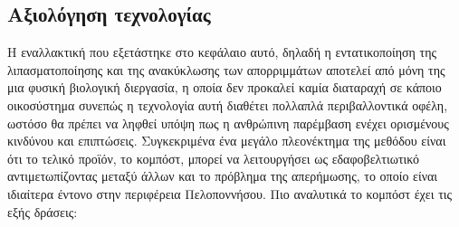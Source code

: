 \documentclass[12pt]{article}
\begin{document}
 	\subsection{Αξιολόγηση τεχνολογίας}
 	
 	Η εναλλακτική που εξετάστηκε στο κεφάλαιο αυτό, δηλαδή η εντατικοποίηση της λιπασματοποίησης και της ανακύκλωσης των απορριμμάτων αποτελεί από μόνη της μια φυσική βιολογική διεργασία, η οποία δεν προκαλεί καμία διαταραχή σε κάποιο οικοσύστημα συνεπώς η τεχνολογία αυτή διαθέτει πολλαπλά περιβαλλοντικά οφέλη, ωστόσο θα πρέπει να ληφθεί υπόψη πως η ανθρώπινη παρέμβαση ενέχει ορισμένους κινδύνου και επιπτώσεις. Συγκεκριμένα ένα μεγάλο πλεονέκτημα της μεθόδου είναι ότι το τελικό προϊόν, το κομπόστ, μπορεί να λειτουργήσει ως εδαφοβελτιωτικό αντιμετωπίζοντας μεταξύ άλλων και το πρόβλημα της απερήμωσης, το οποίο είναι ιδιαίτερα έντονο στην περιφέρεια Πελοποννήσου. Πιο αναλυτικά το κομπόστ έχει τις εξής δράσεις:
 	
\end{document}
